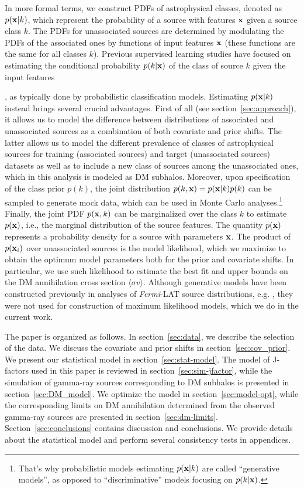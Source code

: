 \documentclass[12pt, a4paper]{article}
\newcommand{\Fermi}{{\sl Fermi}}
\newcommand{\bx}{{\bf x}}
\newcommand{\sigmav}{\langle \sigma v \rangle}
\newcommand{\FermiMLclassif}{
\cite{2012ApJ...753...83A, 2016ApJ...825...69M, 2016ApJ...820....8S, Lefaucheur:2017ajt, 2019JCAP...11..045C, 2020MNRAS.492.5377L, 2020MNRAS.495.1093H, 2021RAA....21...15Z, 2021MNRAS.505.5853G, 2022A&A...660A..87B, 2023JCAP...07..033B, 2023MNRAS.521.6195M, 2023RASTI...2..735M, 2023MNRAS.520.1348G}}
\begin{document}
In more formal terms, 
we construct PDFs of astrophysical classes, denoted as $p(\bx|k)$,
which represent the probability of a source with features $\bx$ given a source class $k$. 
The PDFs for unassociated sources are determined by modulating the PDFs of the associated ones by functions of input features $\bx$ (these functions are the same for all classes $k$).
Previous supervised learning studies have focused on estimating the conditional probability $p(k|\bx)$ of the class of source $k$ given the input features 
\FermiMLclassif, as typically done by probabilistic classification models.
Estimating $p(\bx|k)$ instead brings several crucial advantages. First of all (see section~\ref{sec:approach}), it allows us to model the difference between distributions of associated and unassociated sources as a combination of both covariate and prior shifts.
The latter allows us to model the different prevalence of classes of astrophysical sources for training (associated sources) and target (unassociated sources) datasets as well as to include a new class of sources among the unassociated ones, which in this analysis is modeled as DM subhalos.
Moreover, upon specification of the class prior $p(k)$, the joint distribution $p(k,\bx)=p(\bx|k)p(k)$ can be sampled to generate mock data, which can be used in Monte Carlo analyses.\footnote{That's why probabilistic models estimating $p(\bx|k)$ are called ``generative models'', as opposed to ``discriminative'' models focusing on $p(k|\bx)$.} Finally, the joint PDF  $p(\bx, k)$ can be marginalized over the class $k$ to estimate $p(\bx)$, i.e., the marginal distribution of the source features. 
The quantity $p(\bx)$
represents a probability density for a source with parameters $\bx$. 
The product of $p(\bx_i)$ over unassociated sources is the model likelihood, which we maximize to obtain the optimum model parameters both for the prior and covariate shifts.
In particular, we use such likelihood to estimate the best fit and upper bounds on the DM annihilation cross section $\sigmav$.
Although generative models have been constructed previously in analyses of \Fermi-LAT source distributions, e.g. \cite{2023MNRAS.520.1348G}, they were not used for construction of maximum likelihood models, which we do in the current work.

The paper is organized as follows.
In section~\ref{sec:data},
we describe the selection of the data.
We discuss the covariate and prior shifts in section~\ref{sec:cov_prior}. We present our statistical model in section~\ref{sec:stat-model}. 
The model of J-factors used in this paper is reviewed in section~\ref{sec:sim-jfactor}, while the simulation of gamma-ray sources corresponding to DM subhalos is presented in section~\ref{sec:DM_model}. 
We optimize the model in section~\ref{sec:model-opt}, while
the corresponding limits on DM annihilation determined from the observed gamma-ray sources are presented in section~\ref{sec:dm-limits}.
Section~\ref{sec:conclusions} contains discussion and conclusions. 
We provide details about the statistical model and
perform several consistency tests in appendices.
\end{document}
